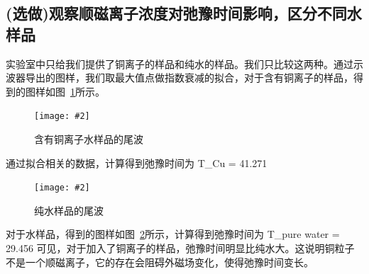 \documentclass{ctexart}
\newcommand{\cpic}[2]{
\begin{center}
\texttt{[image: \#2]}
\end{center}
}
\newcommand{\cpicn}[3]
{
\begin{figure}[H]
\cpic{#1}{#2}
\caption{#3\label{#2}}
\end{figure}
}
\begin{document}
\subsection{(选做)观察顺磁离子浓度对弛豫时间影响，区分不同水样品}
实验室中只给我们提供了铜离子的样品和纯水的样品。我们只比较这两种。通过示波器导出的图样，我们取最大值点做指数衰减的拟合，对于含有铜离子的样品，得到的图样如图~\ref{cu}所示。
\cpicn{0.5}{cu}{含有铜离子水样品的尾波}
通过拟合相关的数据，计算得到弛豫时间为
\beq
T_{Cu} = 41.271
\eeq
\cpicn{0.5}{water}{纯水样品的尾波}
对于水样品，得到的图样如图~\ref{water}所示，计算得到弛豫时间为
\beq
T_{\rm pure water} = 29.456 
\eeq
可见，对于加入了铜离子的样品，弛豫时间明显比纯水大。这说明铜粒子不是一个顺磁离子，它的存在会阻碍外磁场变化，使得弛豫时间变长。





\end{document}
